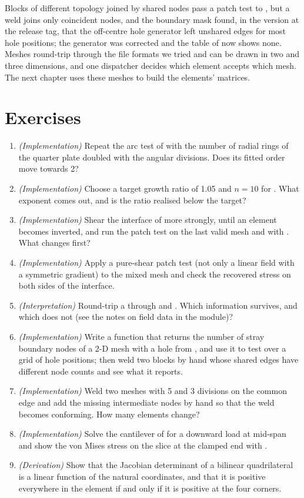 Blocks of different topology joined by shared nodes pass a patch test to \cmeMBErr, but a weld joins only coincident nodes, and the boundary mask found, in the version at the release tag, that the off-centre hole generator left unshared edges for most hole positions; the generator was corrected and the table of  now shows none. Meshes round-trip through the file formats we tried and can be drawn in two and three dimensions, and one dispatcher decides which element accepts which mesh. The next chapter uses these meshes to build the elements' matrices.

\section*{Exercises}\label{sec:me-exercises}
\begin{enumerate}
\item \emph{(Implementation)} Repeat the arc test of  with the number of radial rings of the quarter plate doubled with the angular divisions. Does its fitted order move towards 2?
\item \emph{(Implementation)} Choose a target growth ratio of 1.05 and $n=10$ for . What exponent comes out, and is the ratio realised below the target?
\item \emph{(Implementation)} Shear the interface of  more strongly, until an element becomes inverted, and run the patch test on the last valid mesh and with . What changes first?
\item \emph{(Implementation)} Apply a pure-shear patch test (not only a linear field with a symmetric gradient) to the mixed mesh and check the recovered stress on both sides of the interface.
\item \emph{(Interpretation)} Round-trip a  through  and . Which information survives, and which does not (see the notes on field data in the module)?
\item \emph{(Implementation)} Write a function that returns the number of stray boundary nodes of a 2-D mesh with a hole from , and use it to test  over a grid of hole positions; then weld two blocks by hand whose shared edges have different node counts and see what it reports.
\item \emph{(Implementation)} Weld two meshes with 5 and 3 divisions on the common edge and add the missing intermediate nodes by hand so that the weld becomes conforming. How many elements change?
\item \emph{(Implementation)} Solve the cantilever of  for a downward load at mid-span and show the von Mises stress on the slice at the clamped end with .
\item\label{ex:me-jac} \emph{(Derivation)} Show that the Jacobian determinant of a bilinear quadrilateral is a linear function of the natural coordinates, and that it is positive everywhere in the element if and only if it is positive at the four corners.
\end{enumerate}

